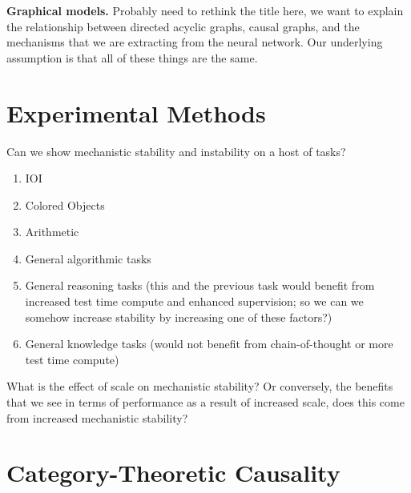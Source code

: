 \documentclass[10pt]{article}
\begin{document}
\textbf{Graphical models.} Probably need to rethink the title here, we want
to explain the relationship between directed acyclic graphs, causal graphs,
and the mechanisms that we are extracting from the neural network. Our
underlying assumption is that all of these things are the same.

\section{Experimental Methods}
Can we show mechanistic stability and instability on a host of tasks?
\begin{enumerate}
\item IOI
\item Colored Objects
\item Arithmetic
\item General algorithmic tasks
\item General reasoning tasks (this and the previous task would benefit
from increased test time compute and enhanced supervision; so we can we
somehow increase stability by increasing one of these factors?)
\item General knowledge tasks (would not benefit from chain-of-thought or more
test time compute)
\end{enumerate}
What is the effect of scale on mechanistic stability? Or conversely, the benefits
that we see in terms of performance as a result of increased scale, does this
come from increased mechanistic stability?




\newpage
\section{Category-Theoretic Causality}
\end{document}
